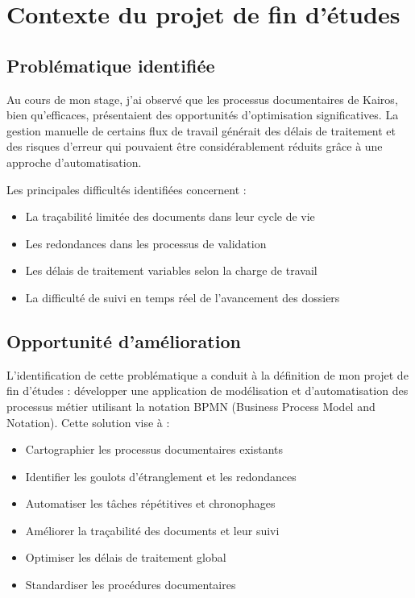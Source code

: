 \section{Contexte du projet de fin d'études}

    \subsection{Problématique identifiée}
    
    Au cours de mon stage, j'ai observé que les processus documentaires de Kairos, bien qu'efficaces, présentaient des opportunités d'optimisation significatives. La gestion manuelle de certains flux de travail générait des délais de traitement et des risques d'erreur qui pouvaient être considérablement réduits grâce à une approche d'automatisation.
    
    Les principales difficultés identifiées concernent :
    \begin{itemize}
        \item La traçabilité limitée des documents dans leur cycle de vie
        \item Les redondances dans les processus de validation
        \item Les délais de traitement variables selon la charge de travail
        \item La difficulté de suivi en temps réel de l'avancement des dossiers
    \end{itemize}
    
    \subsection{Opportunité d'amélioration}
    
    L'identification de cette problématique a conduit à la définition de mon projet de fin d'études : développer une application de modélisation et d'automatisation des processus métier utilisant la notation BPMN (Business Process Model and Notation). Cette solution vise à :
    \begin{itemize}
        \item Cartographier les processus documentaires existants
        \item Identifier les goulots d'étranglement et les redondances
        \item Automatiser les tâches répétitives et chronophages
        \item Améliorer la traçabilité des documents et leur suivi
        \item Optimiser les délais de traitement global
        \item Standardiser les procédures documentaires
    \end{itemize}
    
